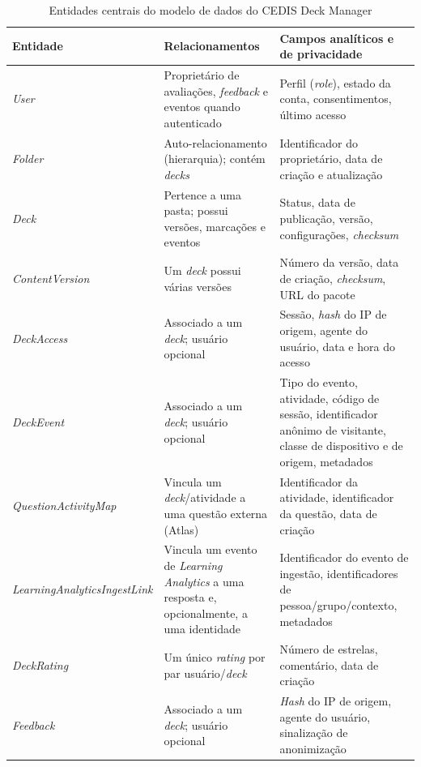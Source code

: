 \begin{table}[htb]
\caption{Entidades centrais do modelo de dados do CEDIS Deck Manager}
\label{tab:entidades-deck-manager}
\centering
\begin{tabularx}{\textwidth}{l>{\raggedright\arraybackslash}X>{\raggedright\arraybackslash}X}
\hline
\textbf{Entidade} & \textbf{Relacionamentos} & \textbf{Campos analíticos e de privacidade} \\
\hline
\textit{User} & Proprietário de avaliações, \textit{feedback} e eventos quando autenticado & Perfil (\textit{role}), estado da conta, consentimentos, último acesso \\
\hline
\textit{Folder} & Auto-relacionamento (hierarquia); contém \textit{decks} & Identificador do proprietário, data de criação e atualização \\
\hline
\textit{Deck} & Pertence a uma pasta; possui versões, marcações e eventos & Status, data de publicação, versão, configurações, \textit{checksum} \\
\hline
\textit{ContentVersion} & Um \textit{deck} possui várias versões & Número da versão, data de criação, \textit{checksum}, URL do pacote \\
\hline
\textit{DeckAccess} & Associado a um \textit{deck}; usuário opcional & Sessão, \textit{hash} do IP de origem, agente do usuário, data e hora do acesso \\
\hline
\textit{DeckEvent} & Associado a um \textit{deck}; usuário opcional & Tipo do evento, atividade, código de sessão, identificador anônimo de visitante, classe de dispositivo e de origem, metadados \\
\hline
\textit{QuestionActivityMap} & Vincula um \textit{deck}/atividade a uma questão externa (Atlas) & Identificador da atividade, identificador da questão, data de criação \\
\hline
\textit{LearningAnalyticsIngestLink} & Vincula um evento de \textit{Learning Analytics} a uma resposta e, opcionalmente, a uma identidade & Identificador do evento de ingestão, identificadores de pessoa/grupo/contexto, metadados \\
\hline
\textit{DeckRating} & Um único \textit{rating} por par usuário/\textit{deck} & Número de estrelas, comentário, data de criação \\
\hline
\textit{Feedback} & Associado a um \textit{deck}; usuário opcional & \textit{Hash} do IP de origem, agente do usuário, sinalização de anonimização \\
\hline
\end{tabularx}
\end{table}


